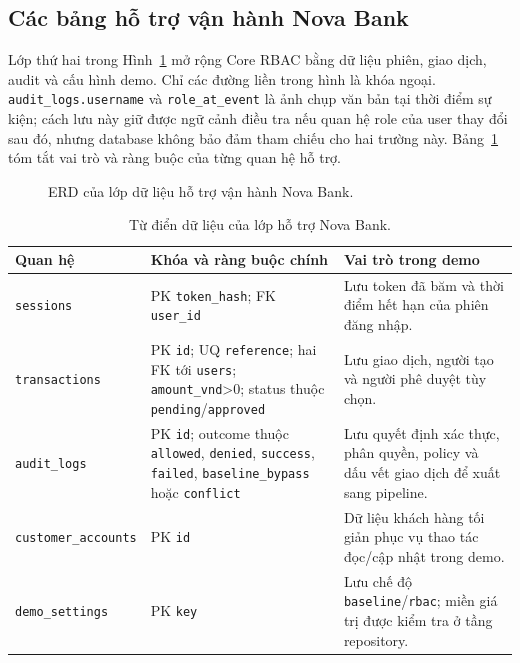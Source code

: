 \subsection{Các bảng hỗ trợ vận hành Nova Bank}

Lớp thứ hai trong Hình~\ref{fig:nova-bank-data-erd} mở rộng Core RBAC bằng dữ
liệu phiên, giao dịch, audit và cấu hình demo. Chỉ các đường liền trong hình là
khóa ngoại. \texttt{audit\_logs.username} và \texttt{role\_at\_event} là ảnh
chụp văn bản tại thời điểm sự kiện; cách lưu này giữ được ngữ cảnh điều tra nếu
quan hệ role của user thay đổi sau đó, nhưng database không bảo đảm tham chiếu
cho hai trường này. Bảng~\ref{tab:nova-bank-data-schema} tóm tắt vai trò và
ràng buộc của từng quan hệ hỗ trợ.

\begin{figure}[htbp]
\centering
\resizebox{0.95\textwidth}{!}{}
\caption{ERD của lớp dữ liệu hỗ trợ vận hành Nova Bank.}
\label{fig:nova-bank-data-erd}
\end{figure}

\begin{table}[htbp]
\centering
\small
\begin{tabularx}{\textwidth}{p{}p{}X}
\toprule
Quan hệ & Khóa và ràng buộc chính & Vai trò trong demo \\
\midrule
\texttt{sessions} & PK \texttt{token\_hash}; FK \texttt{user\_id} & Lưu token đã băm và thời điểm hết hạn của phiên đăng nhập. \\
\texttt{transactions} & PK \texttt{id}; UQ \texttt{reference}; hai FK tới \texttt{users}; \texttt{amount\_vnd}>0; status thuộc \texttt{pending}/\texttt{approved} & Lưu giao dịch, người tạo và người phê duyệt tùy chọn. \\
\texttt{audit\_logs} & PK \texttt{id}; outcome thuộc \texttt{allowed}, \texttt{denied}, \texttt{success}, \texttt{failed}, \texttt{baseline\_bypass} hoặc \texttt{conflict} & Lưu quyết định xác thực, phân quyền, policy và dấu vết giao dịch để xuất sang pipeline. \\
\texttt{customer\_accounts} & PK \texttt{id} & Dữ liệu khách hàng tối giản phục vụ thao tác đọc/cập nhật trong demo. \\
\texttt{demo\_settings} & PK \texttt{key} & Lưu chế độ \texttt{baseline}/\texttt{rbac}; miền giá trị được kiểm tra ở tầng repository. \\
\bottomrule
\end{tabularx}
\caption{Từ điển dữ liệu của lớp hỗ trợ Nova Bank.}
\label{tab:nova-bank-data-schema}
\end{table}

